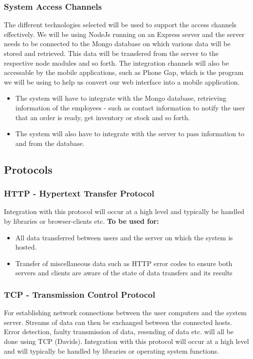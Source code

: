 \documentclass[a4paper,12pt]{article}
\begin{document}
\subsubsection{System Access Channels}
The different technologies selected will be used to support the access channels effectively. We will be using NodeJs running on an Express server and the server needs to be connected to the Mongo database on which various data will be stored and retrieved. This data will be transfered from the server to the respective node modules and so forth. 
The integration channels will also be accessable by the mobile applications, such as Phone Gap, which is the program we will be using to help us convert our web interface into a mobile application.
\begin{itemize}

\item The system will have to integrate with the Mongo database, retrieving information of the employees - such as contact information to notify the user that an order is ready, get inventory or stock and so forth. 

\item The system will also have to integrate with the server to pass information to and from the database.
\end{itemize}

\subsection{Protocols}
\subsubsection{HTTP - Hypertext Transfer Protocol}
Integration with this protocol will occur at a high level and typically be handled by libraries or browser-clients etc.
\textbf{To be used for:	}
	\begin{itemize}
	\item{All data transferred between users and the server on which the system is hosted.}
	\item{Transfer of miscellaneous data such as HTTP error codes to ensure both servers and clients are aware of the state of data transfers and its results}
	\end{itemize}
	
\subsubsection{TCP - Transmission Control Protocol}
 For establishing network connections between the user computers and the system server. Streams of data can then be exchanged between the connected hosts. Error detection, faulty transmission of data, resending of data etc. will all be done using TCP (Davids). Integration with this protocol will occur at a high level and will typically be handled by libraries or operating system functions.
 
\end{document}
